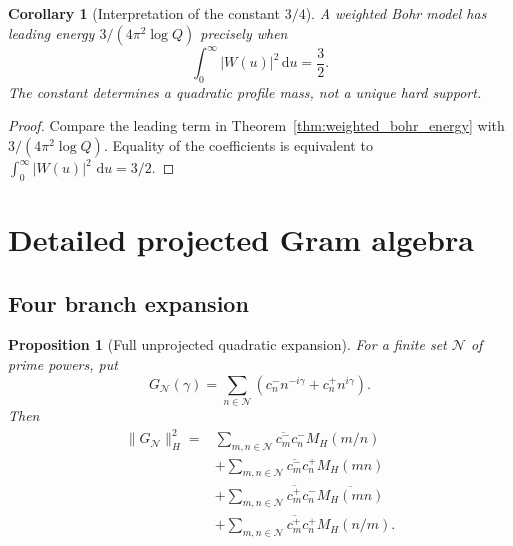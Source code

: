 \documentclass[11pt]{amsart}
\numberwithin{equation}{section}
\theoremstyle{plain}
\newtheorem{proposition}[theorem]{Proposition}
\newtheorem{corollary}[theorem]{Corollary}
\theoremstyle{definition}
\theoremstyle{remark}
\newcommand{\1}{\mathbf{1}}
\newcommand{\dd}{\,\mathrm{d}}
\begin{document}
\begin{corollary}[Interpretation of the constant $3/4$]
\label{cor:three_quarter_profile_mass}
A weighted Bohr model has leading energy
$3/(4\pi^2\log Q)$ precisely when
\begin{equation}
\int_0^\infty|W(u)|^2\dd u
=
\frac32.
\label{eq:profile_mass_three_half}
\end{equation}
The constant determines a quadratic profile mass, not a unique hard support.
\end{corollary}

\begin{proof}
Compare the leading term in
Theorem~\ref{thm:weighted_bohr_energy} with
\(3/(4\pi^2\log Q)\).  Equality of the coefficients is equivalent to
\(\int_0^\infty|W(u)|^2\,\dd u=3/2\).
\end{proof}

\section{Detailed projected Gram algebra}
\label{sec:detailed_gram_algebra}

\subsection{Four branch expansion}
\label{subsec:four_branch_expansion}

\begin{proposition}[Full unprojected quadratic expansion]
\label{prop:full_four_branch_expansion}
For a finite set $\mathcal N$ of prime powers, put
\begin{equation}
G_{\mathcal N}(\gamma)
=
\sum_{n\in\mathcal N}
\left(c_n^-n^{-i\gamma}+c_n^+n^{i\gamma}\right).
\label{eq:G_N_set}
\end{equation}
Then
\begin{align}
\|G_{\mathcal N}\|_H^2
={}&
\sum_{m,n\in\mathcal N}
\overline{c_m^-}c_n^-M_H(m/n)
\label{eq:four_branch_mm}
\\
&+
\sum_{m,n\in\mathcal N}
\overline{c_m^-}c_n^+M_H(mn)
\label{eq:four_branch_mp}
\\
&+
\sum_{m,n\in\mathcal N}
\overline{c_m^+}c_n^-\overline{M_H(mn)}
\label{eq:four_branch_pm}
\\
&+
\sum_{m,n\in\mathcal N}
\overline{c_m^+}c_n^+M_H(n/m).
\label{eq:four_branch_pp}
\end{align}
\end{proposition}
\end{document}
